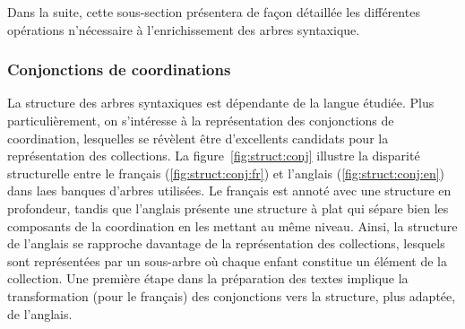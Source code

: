 Dans la suite, cette sous-section présentera de façon détaillée les différentes opérations n'nécessaire à l'enrichissement des arbres syntaxique.

\subsubsection{Conjonctions de coordinations}
La structure des arbres syntaxiques est dépendante de la langue étudiée.
Plus particulièrement, on s'intéresse à la représentation des conjonctions de coordination, lesquelles se révèlent être d'excellents candidats pour la représentation des collections.
La figure~\ref{fig:struct:conj} illustre la disparité structurelle entre le français (\ref{fig:struct:conj:fr}) et l'anglais (\ref{fig:struct:conj:en}) dans laes banques d'arbres utilisées.
Le français est annoté avec une structure en profondeur, tandis que l'anglais présente une structure à plat qui sépare bien les composants de la coordination en les mettant au même niveau.
Ainsi, la structure de l'anglais se rapproche davantage de la représentation des collections, lesquels sont représentées par un sous-arbre où chaque enfant constitue un élément de la collection.
Une première étape dans la préparation des textes implique la transformation (pour le français) des conjonctions vers la structure, plus adaptée, de l'anglais.

